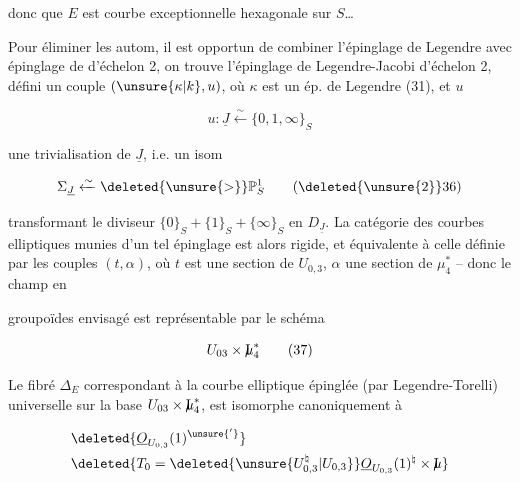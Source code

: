 
donc que $E$ est   courbe  exceptionnelle hexagonale sur $S$\ldots

Pour éliminer les autom, il est opportun de combiner l'épinglage de Legendre avec épinglage de   d'échelon 2, on trouve l'épinglage de Legendre-Jacobi d'échelon 2, défini  un couple $(\unsure{\kappa|k},u)$, où $\kappa$ est un ép. de Legendre (31), et  $u$

\[
u:\underline J\xleftarrow{\sim}\{0,1,\infty\}_S
\tag*{(35)}
\]

une trivialisation de $\underline J$, i.e. un isom

\[
\Sigma_{\underline J}\xleftarrow{\sim}\deleted{\unsure{>}}\mathbb P^1_S
\tag*{(\deleted{\unsure{2}}36)}
\]

transformant le diviseur $\{0\}_S+\{1\}_S+\{\infty\}_S$ en $D_{\underline J}$. La catégorie  des courbes elliptiques munies d'un tel épinglage est alors rigide, et équivalente à celle définie par les couples $(t,\alpha)$, où $t$ est une section de $U_{0,3}$, $\alpha$ une section de $\mu_4^*$ -- donc le  champ en

groupoïdes envisagé est représentable par le schéma

\[
U_{03}\times \mathord{\mathrm{I}\mkern-7mu\mu}_4^*
\tag*{(37)}
\]

Le fibré $\Delta_E$ correspondant à la courbe elliptique épinglée (par Legendre-Torelli) universelle sur la base $U_{03}\times \mathord{\mathrm{I}\mkern-7mu\mu}_4^*$, est isomorphe canoniquement à

\[
\begin{aligned}
&\deleted{\underline O_{U_{0,3}}(1)^{\unsure{'}}}\\
&\deleted{T_0=\deleted{\unsure{U_{0,3}^{\natural}|U_{0,3}}}\underline O_{U_{0,3}}(1)^\natural\times \mathord{\mathrm{I}\mkern-7mu\mu}}
\end{aligned}
\]

